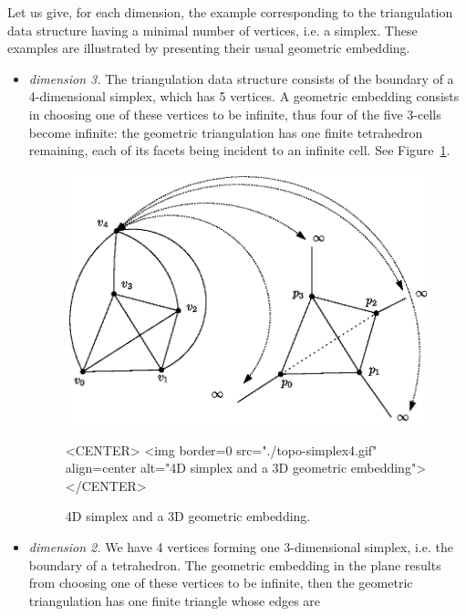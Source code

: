 Let us give, for each dimension, the example corresponding to the
triangulation data structure having a minimal number of vertices, i.e. a 
simplex. These examples are illustrated by presenting their usual
geometric embedding. 
\begin{itemize}
\item \emph{dimension 3.} The triangulation data structure consists of
the boundary of a 4-dimensional simplex, which has 5 vertices. A
geometric embedding consists in choosing one of these vertices to be
infinite, thus four of the five 3-cells become infinite: the geometric
triangulation has one finite tetrahedron remaining, each of its facets
being incident to an infinite cell. See Figure~\ref{TDS3-fig-topo-simplex4}.
\begin{figure}
\begin{ccTexOnly}
\begin{center} 
\includegraphics{topo-simplex4.eps}
\end{center}
\end{ccTexOnly}
\caption{4D simplex and a 3D geometric embedding.
\label{TDS3-fig-topo-simplex4}}
\begin{ccHtmlOnly}
<CENTER>
<img border=0 src="./topo-simplex4.gif" align=center
alt="4D simplex and a 3D geometric embedding">
</CENTER>
\end{ccHtmlOnly}
\end{figure} 
\item \emph{dimension 2.} We have 4 vertices forming one 3-dimensional
simplex, i.e. the boundary of a tetrahedron. The geometric embedding in
the plane results from choosing one of these vertices to be infinite,
then the geometric triangulation has one finite triangle whose edges are

\end{itemize}
